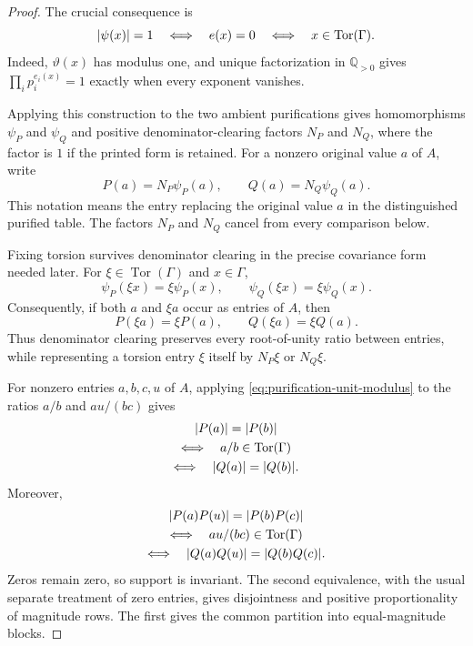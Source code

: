 \documentclass[11pt]{article}
\theoremstyle{plain}
\theoremstyle{definition}
\theoremstyle{remark}
\DeclareMathOperator{\Tor}{Tor}
\DeclarePairedDelimiter{\abs}{\lvert}{\rvert}
\begin{document}
\begin{proof}
The crucial consequence is
\begin{equation}
  \abs{\psi(x)}=1
  \quad\Longleftrightarrow\quad
  e(x)=0
  \quad\Longleftrightarrow\quad
  x\in\Tor(\Gamma).
  \label{eq:purification-unit-modulus}
\end{equation}
Indeed, $\vartheta(x)$ has modulus one, and unique factorization in
$\mathbb Q_{>0}$ gives $\prod_i p_i^{e_i(x)}=1$ exactly when every exponent
vanishes.

Applying this construction to the two ambient purifications gives
homomorphisms $\psi_P$ and $\psi_Q$ and positive denominator-clearing factors
$N_P$ and $N_Q$, where the factor is $1$ if the printed form is retained.
For a nonzero original value $a$ of $A$, write
\[
  P(a)=N_P\psi_P(a),
  \qquad
  Q(a)=N_Q\psi_Q(a).
\]
This notation means the entry replacing the original value $a$ in the
distinguished purified table.  The factors $N_P$ and $N_Q$ cancel from every
comparison below.

Fixing torsion survives denominator clearing in the precise covariance form
needed later.  For $\xi\in\Tor(\Gamma)$ and $x\in\Gamma$,
\begin{equation}
  \psi_P(\xi x)=\xi\psi_P(x),
  \qquad
  \psi_Q(\xi x)=\xi\psi_Q(x).
  \label{eq:purification-torsion-covariance}
\end{equation}
Consequently, if both $a$ and $\xi a$ occur as entries of $A$, then
\[
  P(\xi a)=\xi P(a),
  \qquad
  Q(\xi a)=\xi Q(a).
\]
Thus denominator clearing preserves every root-of-unity ratio between
entries, while representing a torsion entry $\xi$ itself by $N_P\xi$ or
$N_Q\xi$.

For nonzero entries $a,b,c,u$ of $A$, applying
\eqref{eq:purification-unit-modulus} to the ratios $a/b$ and $au/(bc)$ gives
\begin{equation}
  \begin{gathered}
  \abs{P(a)}=\abs{P(b)}\\
  \Longleftrightarrow\quad a/b\in\Tor(\Gamma)\\
  \Longleftrightarrow\quad \abs{Q(a)}=\abs{Q(b)}.
  \end{gathered}
  \label{eq:pure-equal-magnitude}
\end{equation}
Moreover,
\begin{equation*}
  \begin{gathered}
  \abs{P(a)P(u)}=\abs{P(b)P(c)}\\
  \Longleftrightarrow\quad au/(bc)\in\Tor(\Gamma)\\
  \Longleftrightarrow\quad \abs{Q(a)Q(u)}=\abs{Q(b)Q(c)}.
  \end{gathered}
\end{equation*}
Zeros remain zero, so support is invariant.  The second equivalence, with
the usual separate treatment of zero entries, gives disjointness and
positive proportionality of magnitude rows.  The first gives the common
partition into equal-magnitude blocks.


\end{proof}
\end{document}
